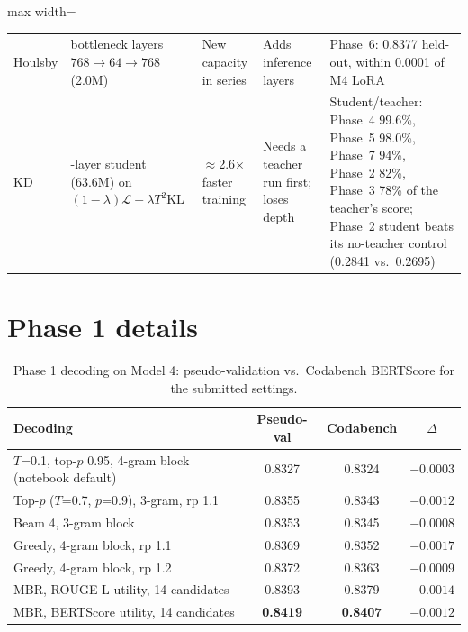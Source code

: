 \documentclass[11pt, oneside]{article}
\newcommand{\best}[1]{\textbf{#1}}
\begin{document}
\begin{table}[H]
\begin{adjustbox}{max width=\textwidth}
\begin{tabular}{>{\raggedright\arraybackslash}p{1.4cm}>{\raggedright\arraybackslash}p{2.9cm}>{\raggedright\arraybackslash}p{3.1cm}>{\raggedright\arraybackslash}p{3.1cm}>{\raggedright\arraybackslash}p{4.4cm}}
\addlinespace
Houlsby & bottleneck layers $768{\to}64{\to}768$ (2.0M) & New capacity in series & Adds inference layers & Phase~6:
0.8377 held-out, within 0.0001 of M4 LoRA\\
\addlinespace
KD & 4-layer student (63.6M) on $(1-\lambda)\mathcal L+\lambda T^2\mathrm{KL}$ & $\approx$2.6$\times$ faster
training & Needs a teacher run first; loses depth & Student/teacher: Phase~4 99.6\%, Phase~5 98.0\%, Phase~7 94\%,
Phase~2 82\%, Phase~3 78\% of the teacher's score; Phase~2 student beats its no-teacher control (0.2841 vs.\ 0.2695)\\
\bottomrule
\end{tabular}
\end{adjustbox}
\end{table}

\section{Phase 1 details}\label{app:p1}
\begin{table}[H]
\centering\small
\caption{Phase 1 decoding on Model 4: pseudo-validation vs.\ Codabench BERTScore for the submitted settings.}
\label{tab:calib}
\begin{tabular}{lccc}
\toprule
Decoding & Pseudo-val & Codabench & $\Delta$\\
\midrule
$T$=0.1, top-$p$ 0.95, 4-gram block (notebook default) & 0.8327 & 0.8324 & $-0.0003$\\
Top-$p$ ($T$=0.7, $p$=0.9), 3-gram, rp 1.1 & 0.8355 & 0.8343 & $-0.0012$\\
Beam 4, 3-gram block & 0.8353 & 0.8345 & $-0.0008$\\
Greedy, 4-gram block, rp 1.1 & 0.8369 & 0.8352 & $-0.0017$\\
Greedy, 4-gram block, rp 1.2 & 0.8372 & 0.8363 & $-0.0009$\\
MBR, ROUGE-L utility, 14 candidates & 0.8393 & 0.8379 & $-0.0014$\\
MBR, BERTScore utility, 14 candidates & \best{0.8419} & \best{0.8407} & $-0.0012$\\
\bottomrule
\end{tabular}
\end{table}
\end{document}
